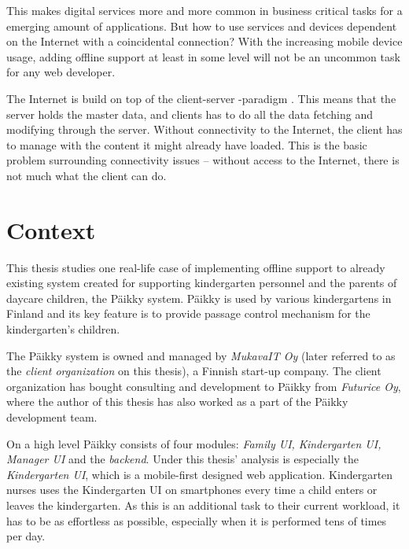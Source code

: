 This makes digital services more and more common in business critical tasks for a emerging amount of applications. But how to use services and devices dependent on the Internet with a coincidental connection? With the increasing mobile device usage, adding offline support at least in some level will not be an uncommon task for any web developer.

The Internet is build on top of the client-server -paradigm \cite{berson_client-server_1992}. This means that the server holds the master data, and clients has to do all the data fetching and modifying through the server. Without connectivity to the Internet, the client has to manage with the content it might already have loaded. This is the basic problem surrounding connectivity issues -- without access to the Internet, there is not much what the client can do.






\section{Context}

This thesis studies one real-life case of implementing offline support to already existing system created for supporting kindergarten personnel and the parents of daycare children, the Päikky system. Päikky is used by various kindergartens in Finland and its key feature is to provide passage control mechanism for the kindergarten's children.

The Päikky system is owned and managed by \textit{MukavaIT Oy} (later referred to as the \textit{client organization} on this thesis), a Finnish start-up company. The client organization has bought consulting and development to  Päikky from \textit{Futurice Oy}, where the author of this thesis has also worked as a part of the Päikky development team.

On a high level Päikky consists of four modules: \textit{Family UI, Kindergarten UI, Manager UI} and the \textit{backend}. Under this thesis' analysis is especially the \textit{Kindergarten UI}, which is a mobile-first designed web application. Kindergarten nurses uses the Kindergarten UI on smartphones every time a child enters or leaves the kindergarten. As this is an additional task to their current workload, it has to be as effortless as possible, especially when it is performed tens of times per day. %

